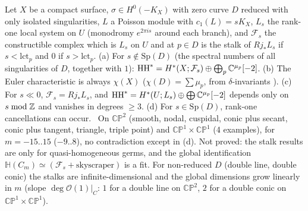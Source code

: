\begin{conj}\tK
Let $X$ be a compact surface, $\sigma\in H^0(-K_X)$ with zero curve $D$ reduced with only isolated singularities, $L$ a Poisson module with $c_1(L)=sK_X$, $L_s$ the rank-one local system on $U$ (monodromy $e^{2\pi is}$ around each branch), and $\mathcal F_s$ the constructible complex which is $L_s$ on $U$ and at $p\in D$ is the stalk of $Rj_*L_s$ if $s<\mathrm{lct}_p$ and $0$ if $s>\mathrm{lct}_p$. (a) For $s\notin\mathrm{Sp}(D)$ (the spectral numbers of all singularities of $D$, together with $1$): $\mathrm{HH}^*=H^*(X;\mathcal F_s)\oplus\bigoplus_p\mathbb C^{\mu_p}[-2]$. (b) The Euler characteristic is always $\chi(X)$ ($\chi(D)=\sum\mu_p$, from $\delta$-invariants \tP). (c) For $s\ll0$, $\mathcal F_s=Rj_*L_s$, and $\mathrm{HH}^*=H^*(U;L_s)\oplus\bigoplus\mathbb C^{\mu_p}[-2]$ depends only on $s\bmod\mathbb Z$ and vanishes in degrees $\ge3$. (d) For $s\in\mathrm{Sp}(D)$, rank-one cancellations can occur.
\tV\ On $\mathbb{CP}^2$ (smooth, nodal, cuspidal, conic plus secant, conic plus tangent, triangle, triple point) and $\mathbb{CP}^1\times\mathbb{CP}^1$ (4 examples), for $m=-15..15$ ($-9..8$), no contradiction except in (d). Not proved: the stalk results are only for quasi-homogeneous germs, and the global identification $\mathbb H(C_m)\simeq(\mathcal F_s+\text{skyscraper})$ is a fit. For non-reduced $D$ (double line, double conic) the stalks are infinite-dimensional and the global dimensions grow linearly in $m$ (slope $\deg\mathcal O(1)|_C$: $1$ for a double line on $\mathbb{CP}^2$, $2$ for a double conic on $\mathbb{CP}^1\times\mathbb{CP}^1$).
\end{conj}

